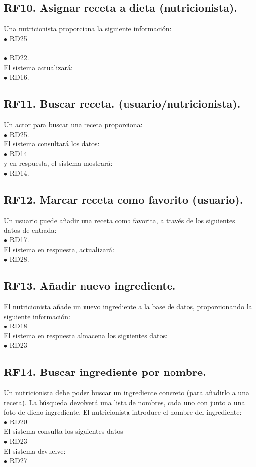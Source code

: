 \documentclass[12pt,letterpaper]{article}
\begin{document}
{\subsection{RF10. Asignar receta a dieta (nutricionista).} Una nutricionista proporciona la siguiente información:
\\ $\bullet$	RD25 \\ 
\\ $\bullet$	RD22.\\ 
El sistema actualizará:
\\ $\bullet$	RD16.\\ 

\subsection{RF11. Buscar receta. (usuario/nutricionista).} Un actor para buscar una receta proporciona: 
\\ $\bullet$	RD25.\\ 
El sistema consultará los datos:
\\ $\bullet$	RD14\\ 
y en respuesta, el sistema mostrará:
\\ $\bullet$	RD14.\\ 

\subsection{RF12. Marcar receta como favorito (usuario).} Un usuario puede añadir una receta como favorita, a través de los siguientes datos de entrada:
\\ $\bullet$	RD17.\\ 
El sistema en respuesta, actualizará:
\\ $\bullet$	RD28.\\ 

\subsection{RF13. Añadir nuevo ingrediente.} El nutricionista añade un nuevo ingrediente a la base de datos, proporcionando la siguiente información:
\\ $\bullet$	RD18\\ 
El sistema en respuesta almacena los siguientes datos:
\\ $\bullet$	RD23\\ 

\subsection{RF14. Buscar ingrediente por nombre.} Un nutricionista debe poder buscar un ingrediente concreto (para añadirlo a una receta). La búsqueda devolverá una lista de nombres, cada uno con junto a una foto de dicho ingrediente.
El nutricionista introduce el nombre del ingrediente:
\\ $\bullet$	RD20\\ 
El sistema consulta los siguientes datos
\\ $\bullet$	RD23\\ 
El sistema devuelve:
\\ $\bullet$	RD27\\ 

}
\end{document}
